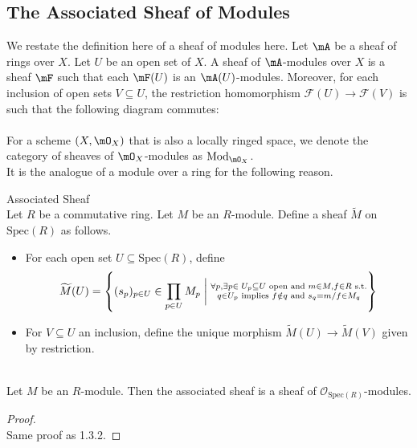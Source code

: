 \documentclass[a4paper]{article}
\begin{document}
\subsection{The Associated Sheaf of Modules}
We restate the definition here of a sheaf of modules here. Let $\mA$ be a sheaf of rings over $X$. Let $U$ be an open set of $X$. A sheaf of $\mA$-modules over $X$ is a sheaf $\mF$ such that each $\mF(U)$ is an $\mA(U)$-modules. Moreover, for each inclusion of open sets $V\subseteq U$, the restriction homomorphism $\mathcal{F}(U)\to\mathcal{F}(V)$ is such that the following diagram commutes: \\
\\

For a scheme $(X,\mO_X)$ that is also a locally ringed space, we denote the category of sheaves of $\mO_X$-modules as $\text{Mod}_{\mO_X}$. \\

It is the analogue of a module over a ring for the following reason. 

\begin{defn}{Associated Sheaf}{}\\
Let $R$ be a commutative ring. Let $M$ be an $R$-module. Define a sheaf $\widetilde{M}$ on $\text{Spec}(R)$ as follows. 
\begin{itemize}
\item For each open set $U\subseteq\text{Spec}(R)$, define $$\widetilde{M}(U)=\left\{(s_p)_{p\in U}\in\prod_{p\in U}M_p\;\bigg{|}\;\substack{\forall p,\exists p\in\;U_p\subseteq U\text{ open and }m\in M,f\in R\text{ s.t.}\\q\in U_p\text{ implies }f\notin q\text{ and }s_q=m/f\in M_q}\right\}$$
\item For $V\subseteq U$ an inclusion, define the unique morphism $\widetilde{M}(U)\to\widetilde{M}(V)$ given by restriction. 
\end{itemize}
\end{defn}

\begin{lmm}{}{}\\
Let $M$ be an $R$-module. Then the associated sheaf is a sheaf of $\mathcal{O}_{\text{Spec}(R)}$-modules. 
\begin{proof}\\
Same proof as 1.3.2. 
\end{proof}
\end{lmm}
\end{document}
